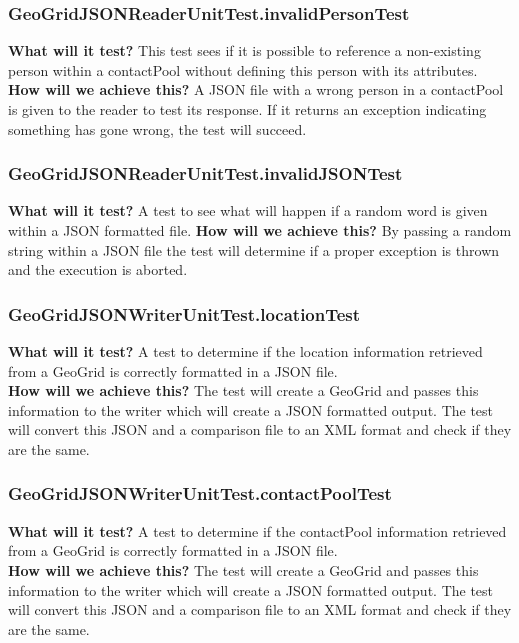 \documentclass{article}
\begin{document}
\subsubsection{GeoGridJSONReaderUnitTest.invalidPersonTest}
\textbf{What will it test?}
This test sees if it is possible to reference a non-existing person within a contactPool without defining this person with its attributes. 
\newline
\textbf{How will we achieve this?}
A JSON file with a wrong person in a contactPool is given to the reader to test its response. If it returns an exception indicating something has gone wrong, the test will succeed.

\subsubsection{GeoGridJSONReaderUnitTest.invalidJSONTest}
\textbf{What will it test?}
A test to see what will happen if a random word is given within a JSON formatted file.
\newline
\textbf{How will we achieve this?}
By passing a random string within a JSON file the test will determine if a proper exception is thrown and the execution is aborted.

\subsubsection{GeoGridJSONWriterUnitTest.locationTest}
\textbf{What will it test?}
A test to determine if the location information retrieved from a GeoGrid is correctly formatted in a JSON file. \\
\newline
\textbf{How will we achieve this?}
The test will create a GeoGrid and passes this information to the writer which will create a JSON formatted output. The test will convert this JSON and a comparison file to an XML format and check if they are the same.

\subsubsection{GeoGridJSONWriterUnitTest.contactPoolTest}
\textbf{What will it test?}
A test to determine if the contactPool information retrieved from a GeoGrid is correctly formatted in a JSON file.\\
\newline
\textbf{How will we achieve this?}
The test will create a GeoGrid and passes this information to the writer which will create a JSON formatted output. The test will convert this JSON and a comparison file to an XML format and check if they are the same.
\end{document}
